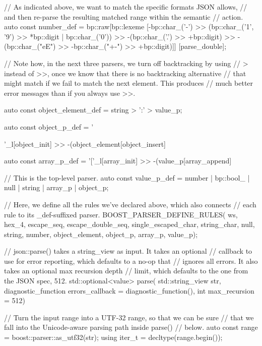 \begin{code}
{    // As indicated above, we want to match the specific formats JSON allows,
    // and then re-parse the resulting matched range within the semantic
    // action.
    auto const number_def =
        bp::raw[bp::lexeme
                    [-bp::char_('-') >>
                     (bp::char_('1', '9') >> *bp::digit | bp::char_('0')) >>
                     -(bp::char_('.') >> +bp::digit) >>
                     -(bp::char_("eE") >> -bp::char_("+-") >> +bp::digit)]]
               [parse_double];

    // Note how, in the next three parsers, we turn off backtracking by using
    // > instead of >>, once we know that there is no backtracking alternative
    // that might match if we fail to match the next element.  This produces
    // much better error messages than if you always use >>.

    auto const object_element_def = string > ':' > value_p;

    auto const object_p_def = '{'_l[object_init] >>
                              -(object_element[object_insert] %

    auto const array_p_def = '['_l[array_init] >>
                             -(value_p[array_append] %

    // This is the top-level parser.
    auto const value_p_def =
        number | bp::bool_ | null | string | array_p | object_p;

    // Here, we define all the rules we've declared above, which also connects
    // each rule to its _def-suffixed parser.
    BOOST_PARSER_DEFINE_RULES(
        ws,
        hex_4,
        escape_seq,
        escape_double_seq,
        single_escaped_char,
        string_char,
        null,
        string,
        number,
        object_element,
        object_p,
        array_p,
        value_p);

    // json::parse() takes a string_view as input.  It takes an optional
    // callback to use for error reporting, which defaults to a no-op that
    // ignores all errors.  It also takes an optional max recursion depth
    // limit, which defaults to the one from the JSON spec, 512.
    std::optional<value> parse(
        std::string_view str,
        diagnostic_function errors_callback = diagnostic_function(),
        int max_recursion = 512)
    {
        // Turn the input range into a UTF-32 range, so that we can be sure
        // that we fall into the Unicode-aware parsing path inside parse()
        // below.
        auto const range = boost::parser::as_utf32(str);
        using iter_t = decltype(range.begin());

}}}
\end{code}
